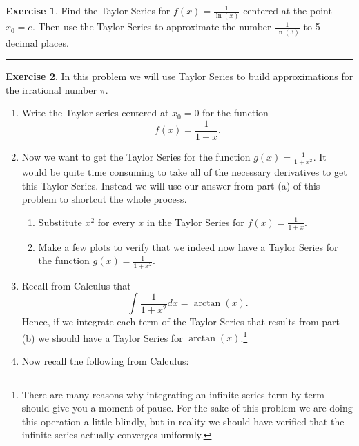 \documentclass[
]{book}
\providecommand{\tightlist}{%
  \setlength{\itemsep}{0pt}\setlength{\parskip}{0pt}}
\theoremstyle{definition}
\theoremstyle{definition}
\theoremstyle{definition}
\newtheorem{exercise}{Exercise}[chapter]
\theoremstyle{remark}
\begin{document}
\begin{exercise}
\protect\hypertarget{exr:unnamed-chunk-66}{}{\label{exr:unnamed-chunk-66} }Find the Taylor Series for \(f(x) = \frac{1}{\ln(x)}\) centered at the point \(x_0 = e\). Then use the Taylor Series to approximate the number \(\frac{1}{\ln(3)}\) to 5 decimal places.
\end{exercise}

\begin{center}\rule{0.5\linewidth}{0.5pt}\end{center}

\begin{exercise}
\protect\hypertarget{exr:unnamed-chunk-67}{}{\label{exr:unnamed-chunk-67} }In this problem we will use Taylor Series to build approximations for
the irrational number \(\pi\).

\begin{enumerate}
\def\labelenumi{\alph{enumi}.}
\item
  Write the Taylor series centered at \(x_0=0\) for the function
  \[ f(x) = \frac{1}{1+x}. \]
\item
  Now we want to get the Taylor Series for the function \(g(x) = \frac{1}{1+x^2}\). It would be quite time consuming to take all of the necessary derivatives to get this Taylor Series. Instead we will use our answer from part (a) of this problem to shortcut the whole process.

  \begin{enumerate}
  \def\labelenumii{\roman{enumii}.}
  \tightlist
  \item
    Substitute \(x^2\) for every \(x\) in the Taylor Series for \(f(x) = \frac{1}{1+x}\).\\
  \item
    Make a few plots to verify that we indeed now have a Taylor Series for the function \(g(x) = \frac{1}{1+x^2}\).
  \end{enumerate}
\item
  Recall from Calculus that
  \[ \int \frac{1}{1+x^2} dx = \arctan(x). \]
  Hence, if we integrate each term of the Taylor Series that results from part (b) we should have a Taylor Series for \(\arctan(x)\).\footnote{There are many reasons why integrating an infinite series term by term should give you a moment of pause. For the sake of this problem we are doing this operation a little blindly, but in reality we should have verified that the infinite series actually converges uniformly.}
\item
  Now recall the following from Calculus:
\end{enumerate}


\end{exercise}
\end{document}
